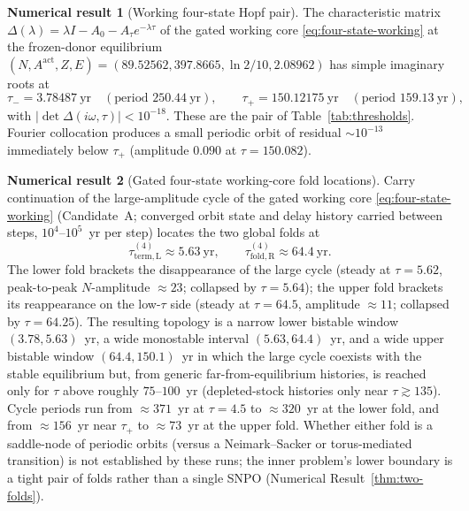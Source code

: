 \documentclass[11pt]{article}
\theoremstyle{definition}
\newtheorem{numresult}{Numerical result}
\begin{document}
\begin{numresult}[Working four-state Hopf pair]
\label{thm:four-hopf}
The characteristic matrix $\Delta(\lambda)=\lambda I-A_0-A_\tau e^{-\lambda\tau}$ of the gated working core \eqref{eq:four-state-working} at the frozen-donor equilibrium $(N,A^{\mathrm{act}},Z,E)=(89.52562,397.8665,\ln 2/10,2.08962)$ has simple imaginary roots at
\[
\tau_-=3.78487~\mathrm{yr}\quad(\text{period }250.44~\mathrm{yr}),\qquad
\tau_+=150.12175~\mathrm{yr}\quad(\text{period }159.13~\mathrm{yr}),
\]
with $|\det\Delta(i\omega,\tau)|<10^{-18}$. These are the pair of Table~\ref{tab:thresholds}. Fourier collocation produces a small periodic orbit of residual $\sim 10^{-13}$ immediately below $\tau_+$ (amplitude $0.090$ at $\tau=150.082$).
\end{numresult}

\begin{numresult}[Gated four-state working-core fold locations]
\label{thm:four-folds}
Carry continuation of the large-amplitude cycle of the gated working core \eqref{eq:four-state-working} (Candidate~A; converged orbit state and delay history carried between steps, $10^4$--$10^5$~yr per step) locates the two global folds at
\[
\tau_{\mathrm{term,L}}^{(4)}\approx 5.63~\mathrm{yr},\qquad
\tau_{\mathrm{fold,R}}^{(4)}\approx 64.4~\mathrm{yr}.
\]
The lower fold brackets the disappearance of the large cycle (steady at $\tau=5.62$, peak-to-peak $N$-amplitude $\approx 23$; collapsed by $\tau=5.64$); the upper fold brackets its reappearance on the low-$\tau$ side (steady at $\tau=64.5$, amplitude $\approx 11$; collapsed by $\tau=64.25$). The resulting topology is a narrow lower bistable window $(3.78,5.63)$~yr, a wide monostable interval $(5.63,64.4)$~yr, and a wide upper bistable window $(64.4,150.1)$~yr in which the large cycle coexists with the stable equilibrium but, from generic far-from-equilibrium histories, is reached only for $\tau$ above roughly $75$--$100$~yr (depleted-stock histories only near $\tau\gtrsim135$). Cycle periods run from $\approx 371$~yr at $\tau=4.5$ to $\approx 320$~yr at the lower fold, and from $\approx 156$~yr near $\tau_+$ to $\approx 73$~yr at the upper fold. Whether either fold is a saddle-node of periodic orbits (versus a Neimark--Sacker or torus-mediated transition) is not established by these runs; the inner problem's lower boundary is a tight pair of folds rather than a single SNPO (Numerical Result~\ref{thm:two-folds}).
\end{numresult}
\end{document}
